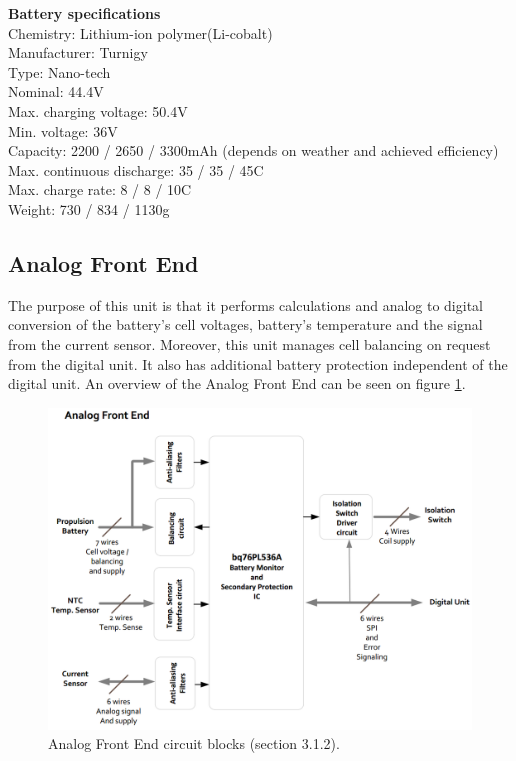 \textbf{Battery specifications}\\
Chemistry: Lithium-ion polymer(Li-cobalt)\\
Manufacturer: Turnigy\\
Type: Nano-tech\\
Nominal: 44.4V\\
Max. charging voltage: 50.4V\\
Min. voltage: 36V\\
Capacity: 2200 / 2650 / 3300mAh (depends on weather and achieved efficiency)\\
Max. continuous discharge: 35 / 35 / 45C\\
Max. charge rate: 8 / 8 / 10C\\
Weight: 730 / 834 / 1130g\\

\subsection{Analog Front End}
The purpose of this unit is that it performs calculations and analog to digital conversion of the battery's cell voltages, battery's temperature and the signal from the current sensor. Moreover, this unit manages cell balancing on request from the digital unit. It also has additional battery protection independent of the digital unit.
An overview of the Analog Front End can be seen on figure \ref{fig:frontendOverview}.

\begin{figure}[H]
	\centering
	\includegraphics[width=1.0\linewidth]{Hardware/Pictures/analogfrontendOverview}
	\caption[Empty]{Analog Front End circuit blocks \cite{BMSDocumentation} (section 3.1.2).}
	\label{fig:frontendOverview}
\end{figure}

